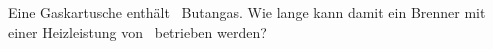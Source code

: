 Eine Gaskartusche enthält \mBuO\ Butangas. Wie lange kann damit ein Brenner mit einer Heizleistung von \PBrO\ betrieben werden?
